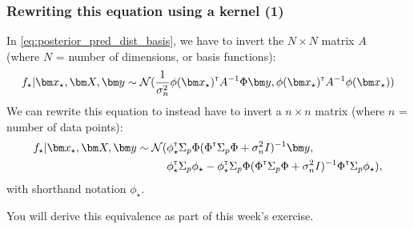 
\begin{frame}
\frametitle{Rewriting this equation using a kernel (1)}
In \eqref{eq:posterior_pred_dist_basis}, we have to invert the $N \times N$ matrix $A$\\
(where $N$ = number of dimensions, or basis functions):
%
\begin{equation*}
f_{\star} | \bx_{\star}, \bX, \by \sim \norm(\frac{1}{\sigma_n^2} \phi(\bx_{\star})\transpose A\inv \Phi \by,
\phi(\bx_{\star})\transpose A\inv \phi(\bx_{\star}))
\end{equation*}
%
We can rewrite this equation to instead have to invert a $n \times n$ matrix (where $n$ = number of data
points):
%
\renewcommand\theequation{2.\thedefcounter}
\setcounter{defcounter}{12}
\begin{align}
f_{\star} | \bx_{\star}, \bX, \by \sim \norm (&\phi_{\star}\transpose \Sigma_p \Phi(\Phi\transpose \Sigma_p \Phi + \sigma_n^2I)^{-1}\by, \\
\nonumber{} & \phi_{\star}\transpose \Sigma_p\phi_{\star} - \phi_{\star}\transpose \Sigma_p \Phi(\Phi\transpose \Sigma_p \Phi + \sigma_n^2I)\inv
\Phi\transpose \Sigma_p \phi_{\star}),
\end{align}
%
with shorthand notation $\phi_{\star}$.

\alert{You will derive this equivalence as part of this week's exercise.}

\end{frame}

